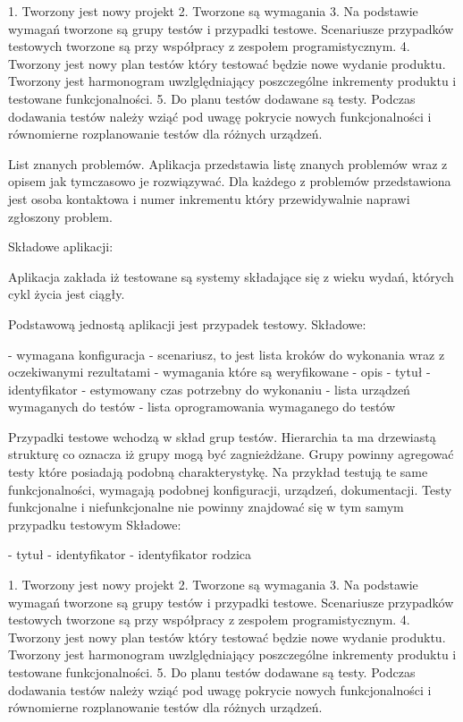 1. Tworzony jest nowy projekt
2. Tworzone są wymagania
3. Na podstawie wymagań tworzone są grupy testów i przypadki testowe. Scenariusze przypadków testowych tworzone są przy współpracy z zespołem programistycznym.
4. Tworzony jest nowy plan testów który testować będzie nowe wydanie produktu. Tworzony jest harmonogram uwzlględniający poszczególne inkrementy produktu i testowane funkcjonalności.
5. Do planu testów dodawane są testy. Podczas dodawania testów należy wziąć pod uwagę pokrycie nowych funkcjonalności i równomierne rozplanowanie testów dla różnych urządzeń.



List znanych problemów.
Aplikacja przedstawia listę znanych problemów wraz z opisem jak tymczasowo je rozwiązywać. Dla każdego z problemów przedstawiona jest osoba kontaktowa i numer inkrementu który przewidywalnie naprawi zgłoszony problem.


Składowe aplikacji:

Aplikacja zakłada iż testowane są systemy składające się z wieku wydań, których cykl życia jest ciągły.

Podstawową jednostą aplikacji jest przypadek testowy. Składowe:

- wymagana konfiguracja
- scenariusz, to jest lista kroków do wykonania wraz z oczekiwanymi rezultatami
- wymagania które są weryfikowane 
- opis
- tytuł
- identyfikator
- estymowany czas potrzebny do wykonaniu
- lista urządzeń wymaganych do testów
- lista oprogramowania wymaganego do testów

Przypadki testowe wchodzą w skład grup testów. Hierarchia ta ma drzewiastą strukturę co oznacza iż grupy mogą być zagnieżdżane. Grupy powinny agregować testy które posiadają podobną charakterystykę. Na przykład testują te same funkcjonalności, wymagają podobnej konfiguracji, urządzeń, dokumentacji. Testy funkcjonalne i niefunkcjonalne nie powinny znajdować się w tym samym przypadku testowym Składowe:

- tytuł
- identyfikator
- identyfikator rodzica

1. Tworzony jest nowy projekt
2. Tworzone są wymagania
3. Na podstawie wymagań tworzone są grupy testów i przypadki testowe. Scenariusze przypadków testowych tworzone są przy współpracy z zespołem programistycznym.
4. Tworzony jest nowy plan testów który testować będzie nowe wydanie produktu. Tworzony jest harmonogram uwzlględniający poszczególne inkrementy produktu i testowane funkcjonalności.
5. Do planu testów dodawane są testy. Podczas dodawania testów należy wziąć pod uwagę pokrycie nowych funkcjonalności i równomierne rozplanowanie testów dla różnych urządzeń.





